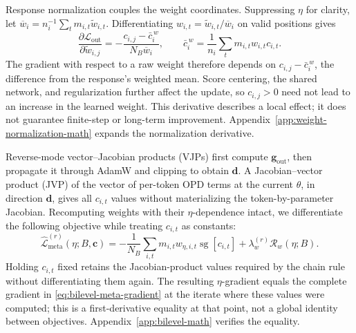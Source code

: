 \documentclass{article}
\theoremstyle{plain}
\theoremstyle{definition}
\theoremstyle{remark}
\begin{document}
Response normalization couples the weight coordinates. Suppressing \(\eta\) for clarity, let \(\overline w_i=n_i^{-1}\sum_t m_{i,t}\widetilde w_{i,t}\). Differentiating \(w_{i,t}=\widetilde w_{i,t}/\overline w_i\) on valid positions gives
\begin{equation}
    \frac{\partial\mathcal L_{\mathrm{out}}}{\partial\widetilde w_{i,j}}
    =-\frac{c_{i,j}-\bar c_i^{\,w}}{N_B\overline w_i},
    \qquad
    \bar c_i^{\,w}=\frac{1}{n_i}\sum_t m_{i,t}w_{i,t}c_{i,t}.
    \label{eq:relative-token-credit}
\end{equation}
The gradient with respect to a raw weight therefore depends on \(c_{i,j}-\bar c_i^{\,w}\), the difference from the response's weighted mean. Score centering, the shared network, and regularization further affect the update, so \(c_{i,j}>0\) need not lead to an increase in the learned weight. This derivative describes a local effect; it does not guarantee finite-step or long-term improvement. Appendix~\ref{app:weight-normalization-math} expands the normalization derivative.

Reverse-mode vector--Jacobian products (VJPs) first compute \(\boldsymbol g_{\mathrm{out}}\), then propagate it through AdamW and clipping to obtain \(\boldsymbol d\). A Jacobian--vector product (JVP) of the vector of per-token OPD terms at the current \(\theta\), in direction \(\boldsymbol d\), gives all \(c_{i,t}\) values without materializing the token-by-parameter Jacobian. Recomputing weights with their \(\eta\)-dependence intact, we differentiate the following objective while treating \(c_{i,t}\) as constants:
\begin{equation}
    \widehat{\mathcal L}_{\mathrm{meta}}^{(r)}(\eta;B,\boldsymbol c)
    =-\frac{1}{N_B}\sum_{i,t}m_{i,t}
      w_{\eta,i,t}\operatorname{sg}[c_{i,t}]
      +\lambda_w^{(r)}\mathcal R_w(\eta;B).
    \label{eq:compatibility-surrogate}
\end{equation}
Holding \(c_{i,t}\) fixed retains the Jacobian-product values required by the chain rule without differentiating them again. The resulting \(\eta\)-gradient equals the complete gradient in \cref{eq:bilevel-meta-gradient} at the iterate where these values were computed; this is a first-derivative equality at that point, not a global identity between objectives. Appendix~\ref{app:bilevel-math} verifies the equality.
\end{document}
